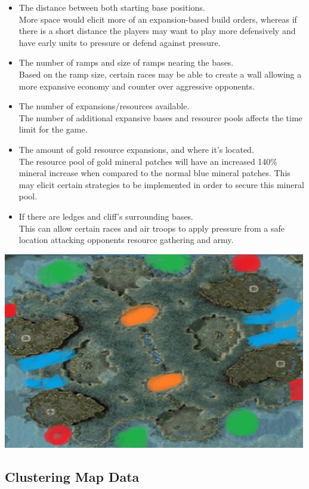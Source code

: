 \documentclass[a4paper,12pt]{report}
\begin{document}
\begin{itemize}
\item The distance between both starting base positions. \\
More space would elicit more of an expansion-based build orders, whereas if there is a short distance the players may want to play more defensively and have early units to pressure or defend against pressure.
\item The number of ramps and size of ramps nearing the bases. \\
Based on the ramp size, certain races may be able to create a wall allowing a more expansive economy and counter over aggressive opponents.
\item The number of expansions/resources available. \\
The number of additional expansive bases and resource pools affects the time limit for the game.
\item The amount of gold resource expansions, and where it’s located. \\
The resource pool of gold mineral patches will have an increased 140\% mineral increase when compared to the normal blue mineral patches. This may elicit certain strategies to be implemented in order to secure this mineral pool.
\item If there are ledges and cliff’s surrounding bases. \\
This can allow certain races and air troops to apply pressure from a safe location attacking opponents resource gathering and army.
\end{itemize}

\begin{center}
    \captionsetup{type=figure}
    \includegraphics[width=.5\linewidth]{media/mapgeo.png}
\end{center}

\subsection{Clustering Map Data}
\end{document}
